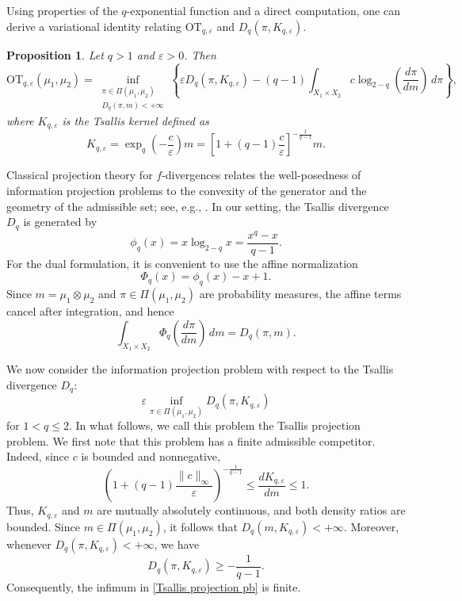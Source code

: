 \documentclass[a4paper,11pt]{article}
\theoremstyle{plain}
\newtheorem{prop}[thm]{Proposition}
\theoremstyle{definition}
\theoremstyle{remark}
\theoremstyle{plain}
\numberwithin{equation}{section}
\newcommand{\D}{\mathcal{D}}
\newcommand{\ep}{\varepsilon}
\newcommand{\1}{\mbox{1}\hspace{-0.25em}\mbox{l}} %
\begin{document}
Using properties of the $q$-exponential function and a direct computation, one can derive a variational identity relating $\mathrm{OT}_{q,\ep}$ and $D_q(\pi, K_{q,\ep})$.
\begin{prop}\label{prop1}
Let $q>1$ and $\ep>0$. Then
\begin{equation}\label{eq;prop1}
\mathrm{OT}_{q, \ep}(\mu_1, \mu_2) = \inf_{\substack{\pi \in \Pi(\mu_1, \mu_2)\\D_q(\pi,m)<+\infty}} \left\{\ep D_q(\pi, K_{q,\ep}) - (q - 1) \int_{X_1\times X_2} c \log_{2 - q}\left(\frac{d\pi}{dm}\right)\, d\pi\right\},
\end{equation}
where $K_{q,\ep}$ is the Tsallis kernel defined as
\begin{equation*}
  K_{q,\ep} = \exp_q\left(-\frac{c}{\ep}\right) m
  = \left[1+(q-1)\frac{c}{\ep}\right]^{-\frac{1}{q-1}} m.  
\end{equation*}
\end{prop}

Classical projection theory for $f$-divergences relates the well-posedness of information projection problems to the convexity of the generator and the geometry of the admissible set; see, e.g., \cite{Csiszar1975, BroniatowskiKeziou}. In our setting, the Tsallis divergence $D_q$ is generated by
\begin{equation*}
\phi_q(x) = x\log_{2-q}x = \frac{x^q-x}{q-1}.
\end{equation*}
For the dual formulation, it is convenient to use the affine normalization
\begin{equation*}
\Phi_q(x) = \phi_q(x)-x+1.
\end{equation*}
Since $m = \mu_1\otimes\mu_2$ and $\pi\in\Pi(\mu_1,\mu_2)$ are probability measures, the affine terms cancel after integration, and hence
\begin{equation*}
\int_{X_1\times X_2} \Phi_q\left(\frac{d\pi}{dm}\right)\,dm = D_q(\pi,m).
\end{equation*}

We now consider the information projection problem with respect to the Tsallis divergence $D_q$:
\begin{equation}\label{Tsallis projection pb}
\ep\inf_{\pi\in\Pi(\mu_1,\mu_2)} D_q(\pi,K_{q,\ep})
\end{equation}
for $1 < q \leq 2$. In what follows, we call this problem the Tsallis projection problem. We first note that this problem has a finite admissible competitor. Indeed, since $c$ is bounded and nonnegative,
\begin{equation*}
\left( 1+(q-1)\frac{\|c\|_\infty}{\ep} \right)^{-\frac{1}{q-1}} \leq \frac{dK_{q,\ep}}{dm} \leq 1.
\end{equation*}
Thus, $K_{q,\ep}$ and $m$ are mutually absolutely continuous, and both density ratios are bounded. Since $m\in\Pi(\mu_1,\mu_2)$, it follows that $D_q(m,K_{q,\ep}) < +\infty$. Moreover, whenever $D_q(\pi,K_{q,\ep})<+\infty$, we have
\begin{equation*}
D_q(\pi,K_{q,\ep}) \geq -\frac{1}{q-1}.
\end{equation*}
Consequently, the infimum in \eqref{Tsallis projection pb} is finite.
\end{document}
